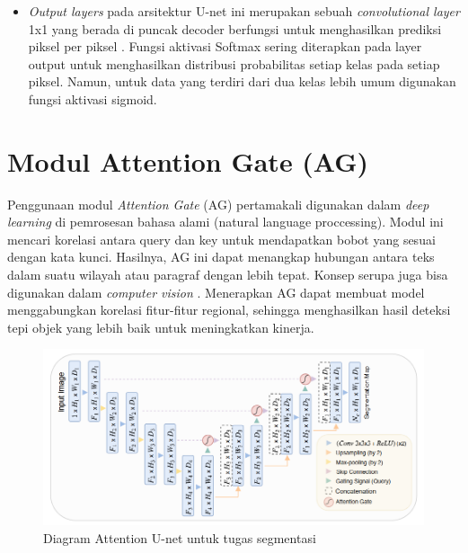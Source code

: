 \begin{itemize}
	\item \textit{Output layers}  pada arsitektur U-net ini merupakan sebuah \textit{convolutional layer} 1x1 yang berada di puncak decoder berfungsi untuk menghasilkan prediksi piksel per piksel \cite{huang_fully_2022,azad_medical_2022}. Fungsi aktivasi Softmax sering diterapkan pada layer output untuk menghasilkan distribusi probabilitas setiap kelas pada setiap piksel. Namun, untuk data yang terdiri dari dua kelas lebih umum digunakan fungsi aktivasi sigmoid.
	
	
\end{itemize}



\section{Modul Attention Gate (AG)}

\noindent Penggunaan modul \textit{Attention Gate} (AG) pertamakali digunakan dalam \textit{deep learning} di pemrosesan bahasa alami (natural language proccessing)\cite{azad_medical_2022}. Modul ini mencari korelasi antara query dan key untuk mendapatkan bobot yang sesuai dengan kata kunci. Hasilnya, AG ini dapat menangkap hubungan antara teks dalam suatu wilayah atau paragraf dengan lebih tepat. Konsep serupa juga bisa digunakan dalam \textit{computer vision} \cite{huang_fully_2022}. Menerapkan AG dapat membuat model menggabungkan korelasi fitur-fitur regional, sehingga menghasilkan hasil deteksi tepi objek yang lebih baik untuk meningkatkan kinerja.

\begin{figure}[H]
	\centering
	\includegraphics[scale=.7]{gambar/AG-U.png}
	\caption{Diagram Attention U-net untuk tugas segmentasi \cite{oktay_attention_2018}}
	\label{fig:Attention-U-net}
\end{figure}

